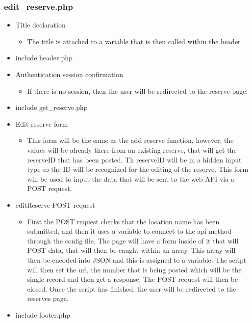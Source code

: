     \subsubsection{edit\_reserve.php}
        \begin{itemize}
            \item Title declaration
            \begin{itemize}
                \item The title is attached to a variable that is then called within the header
            \end{itemize}
            \item include header.php
            \item Authentication session confirmation
            \begin{itemize}
                \item If there is no session, then the user will be redirected to the reserve page.
            \end{itemize}
            \item include get\_reserve.php
            \item Edit reserve form
            \begin{itemize}
                \item This form will be the same as the add reserve function, however, the values will be already there from an existing reserve, that will get the reserveID that has been posted. Th reserveID will be in a hidden input type so the ID will be recognized for the editing of the reserve. This form will be used to input the data that will be sent to the web API via a POST request.
            \end{itemize}
            \item editReserve POST request
            \begin{itemize}
                \item First the POST request checks that the location name has been submitted, and then it uses a variable to connect to the api method through the config file. The page will have a form inside of it that will POST data, that will then be caught within an array. This array will then be encoded into JSON and this is assigned to a variable. The script will then set the url, the number that is being posted which will be the single record and then get a response. The POST request will then be closed. Once the script has finished, the user will be redirected to the reserves page.
            \end{itemize}
            \item include footer.php
        \end{itemize}

